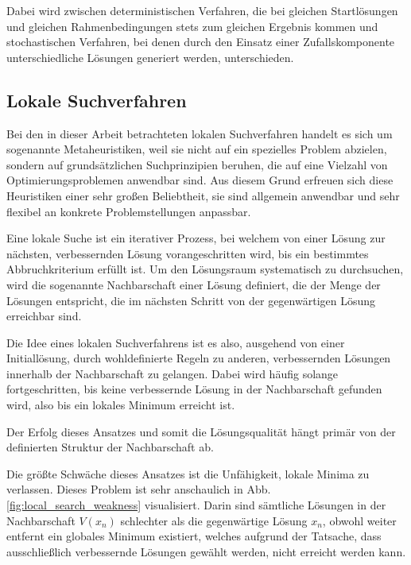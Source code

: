 Dabei wird zwischen deterministischen Verfahren, die bei gleichen Startlösungen und gleichen Rahmenbedingungen stets zum gleichen
Ergebnis kommen und stochastischen Verfahren, bei denen durch den Einsatz einer Zufallskomponente unterschiedliche Lösungen
generiert werden, unterschieden. \cite{Knust2017}

\subsection{Lokale Suchverfahren}
\label{sec:local_search}

Bei den in dieser Arbeit betrachteten lokalen Suchverfahren handelt es sich um sogenannte Metaheuristiken,
weil sie nicht auf ein spezielles Problem abzielen, sondern auf grundsätzlichen Suchprinzipien beruhen,
die auf eine Vielzahl von Optimierungsproblemen anwendbar sind.
Aus diesem Grund erfreuen sich diese Heuristiken einer sehr großen Beliebtheit,
sie sind allgemein anwendbar und sehr flexibel an konkrete Problemstellungen anpassbar.

Eine lokale Suche ist ein iterativer Prozess, bei welchem von einer Lösung zur nächsten, verbessernden Lösung vorangeschritten wird,
bis ein bestimmtes Abbruchkriterium erfüllt ist. Um den Lösungsraum systematisch zu durchsuchen, wird die
sogenannte Nachbarschaft einer Lösung definiert, die der Menge der Lösungen entspricht, die im nächsten Schritt
von der gegenwärtigen Lösung erreichbar sind. \cite{Brucker2006}

Die Idee eines lokalen Suchverfahrens ist es also, ausgehend von einer Initiallösung, durch wohldefinierte Regeln zu anderen,
verbessernden Lösungen innerhalb der Nachbarschaft zu gelangen.
Dabei wird häufig solange fortgeschritten, bis keine verbessernde Lösung in der Nachbarschaft gefunden wird,
also bis ein lokales Minimum erreicht ist.

Der Erfolg dieses Ansatzes und somit die Lösungsqualität hängt primär von der definierten Struktur der Nachbarschaft ab. \cite{Pirlot1996}

Die größte Schwäche dieses Ansatzes ist die Unfähigkeit, lokale Minima zu verlassen. Dieses Problem ist sehr
anschaulich in Abb. \ref{fig:local_search_weakness} visualisiert. Darin sind sämtliche Lösungen in der Nachbarschaft $V(x_n)$ schlechter
als die gegenwärtige Lösung $x_n$, obwohl weiter entfernt ein globales Minimum existiert, welches
aufgrund der Tatsache, dass ausschließlich verbessernde Lösungen gewählt werden, nicht erreicht werden kann.

